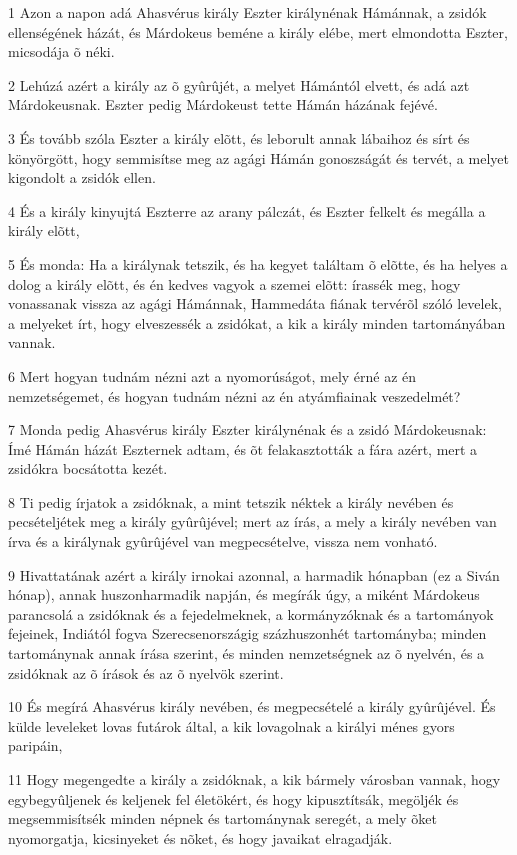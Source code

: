 \par 1 Azon a napon adá Ahasvérus király Eszter királynénak Hámánnak, a zsidók ellenségének házát, és Márdokeus beméne a király elébe, mert elmondotta Eszter, micsodája õ néki.
\par 2 Lehúzá azért a király az õ gyûrûjét, a melyet Hámántól elvett, és adá azt Márdokeusnak. Eszter pedig Márdokeust tette Hámán házának fejévé.
\par 3 És tovább szóla Eszter a király elõtt, és leborult annak lábaihoz és sírt és könyörgött, hogy semmisítse meg az agági Hámán gonoszságát és tervét, a melyet kigondolt a zsidók ellen.
\par 4 És a király kinyujtá Eszterre az arany pálczát, és Eszter felkelt és megálla a király elõtt,
\par 5 És monda: Ha a királynak tetszik, és ha kegyet találtam õ elõtte, és ha helyes a dolog a király elõtt, és én kedves vagyok a szemei elõtt: írassék meg, hogy vonassanak vissza az agági Hámánnak, Hammedáta fiának tervérõl szóló levelek, a melyeket írt, hogy elveszessék a zsidókat, a kik a király minden tartományában vannak.
\par 6 Mert hogyan tudnám nézni azt a nyomorúságot, mely érné az én nemzetségemet, és hogyan tudnám nézni az én atyámfiainak veszedelmét?
\par 7 Monda pedig Ahasvérus király Eszter királynénak és a zsidó Márdokeusnak: Ímé Hámán házát Eszternek adtam, és õt  felakasztották a fára azért, mert a zsidókra bocsátotta kezét.
\par 8 Ti pedig írjatok a zsidóknak, a mint tetszik néktek a király nevében és pecsételjétek meg a király gyûrûjével; mert az írás, a mely a király nevében van írva és a királynak gyûrûjével van megpecsételve,  vissza nem vonható.
\par 9 Hivattatának azért a király irnokai azonnal, a harmadik hónapban (ez a Siván hónap), annak huszonharmadik napján, és megírák úgy, a miként Márdokeus parancsolá a zsidóknak és a fejedelmeknek, a kormányzóknak és a tartományok fejeinek, Indiától fogva Szerecsenországig  százhuszonhét tartományba; minden tartománynak annak írása szerint, és minden nemzetségnek az õ nyelvén, és a zsidóknak az õ írások és az õ nyelvök szerint.
\par 10 És megírá Ahasvérus király nevében, és megpecsételé a király gyûrûjével. És külde leveleket lovas futárok által, a kik lovagolnak a királyi ménes gyors paripáin,
\par 11 Hogy megengedte a király a zsidóknak, a kik bármely városban vannak, hogy egybegyûljenek és keljenek fel életökért, és hogy kipusztítsák, megöljék és megsemmisítsék minden népnek és tartománynak seregét, a mely õket nyomorgatja, kicsinyeket és nõket, és hogy javaikat elragadják.
